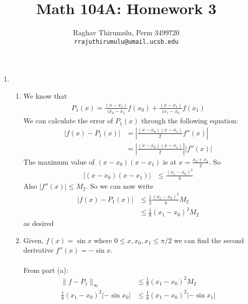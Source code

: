 \documentclass{article}
\begin{document}
\title{Math 104A: Homework 3}
\author{Raghav Thirumulu, Perm 3499720 \\ \texttt{rrajuthirumulu@umail.ucsb.edu}}
\maketitle

\begin{enumerate}
    \item %
        \begin{enumerate}
            \item %
            We know that 
            \begin{align*}
                P_{1}(x) = \frac{(x-x_{1})}{(x_{0}-x_{1}}f(x_{0}) + \frac{(x-x_{1})}{(x_{1}-x_{0}}f(x_{1})
            \end{align*}
            We can calculate the error of $ P_{1}(x) $ through the following equation:
            \begin{align*}
                |f(x)-P_{1}(x)| &= |\frac{(x-x_{0})(x-x_{1})}{2}f''(x)| \\
                &= |\frac{(x-x_{0})(x-x_{1})}{2}||f''(x)|
            \end{align*}            
            The maximum value of $ (x-x_{0})(x-x_{1}) $ is at $ x = \frac{x_{0}+x_{1}}{2} $. So
            \begin{align*}
                |(x-x_{0})(x-x_{1})| &\leq \frac{(x_{1}-x_{0})^2}{4}
            \end{align*}
            Also $ |f''(x)| \leq M_{2}$. So we can now write 
            \begin{align*}
                |f(x)-P_{1}(x)| &\leq \frac{1}{2}\frac{(x_{1}-x_{0})^2}{4}M_{2} \\
                &\leq \frac{1}{8}{(x_{1}-x_{0})^2}M_{2}
            \end{align*}
            as desired
            \item %
            Given, $ f(x) = \sin{x} $ where $ 0 \leq x,x_{0},x_{1} \leq \pi/2 $ we can find the second derivative $ f''(x) = -\sin{x}$. \\
            \\
            From part (a):
            \begin{align*}
                    \| f-P_1 \|_{\infty} &\leq \frac{1}{8}(x_{1}-x_{0})^2M_{2} \\
                    \frac{1}{8}(x_{1}-x_{0})^2| -\sin{x_0} | &\leq \frac{1}{8}(x_{1}-x_{0})^2| -\sin{x_1} | \\

\end{align*}
\end{enumerate}
\end{enumerate}
\end{document}
